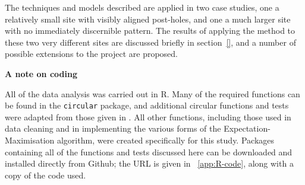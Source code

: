 \documentclass[../../ArchStats.tex]{subfiles}
\begin{document}
The techniques and models described are applied in two case studies, one a relatively small site with visibly aligned post-holes, and one a much larger site with no immediately discernible pattern. The results of applying the method to these two very different sites are discussed briefly in section~\ref{}, and a number of possible extensions to the project are proposed.


\textbf{A note on coding}

All of the data analysis was carried out in R. Many of the required functions can be found in the \texttt{circular} package, and additional circular functions and tests were adapted from those given in \cite{Pewsey2014}. All other functions, including those used in data cleaning and in implementing the various forms of the Expectation-Maximisation algorithm, were created specifically for this study. Packages containing all of the functions and tests discussed here can be downloaded and installed directly from Github; the URL is given in ~\autoref{app:R-code}, along with a copy of the code used.
\end{document}
